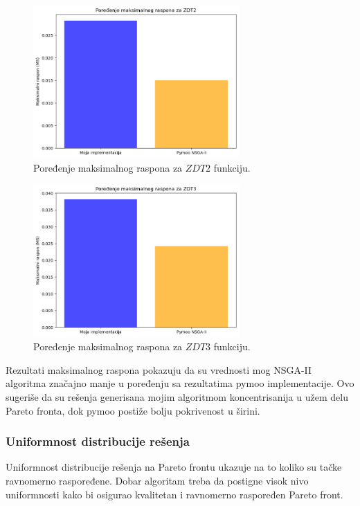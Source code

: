\documentclass[12pt]{article}
\begin{document}
\begin{figure}[H]
    \centering
    \includegraphics[width=0.7\textwidth]{images/ms_zdt2.png}
    \caption{Poređenje maksimalnog raspona za \( ZDT2 \) funkciju.}
    \label{fig:ms_zdt2}
\end{figure}

\begin{figure}[H]
    \centering
    \includegraphics[width=0.7\textwidth]{images/ms_zdt3.png}
    \caption{Poređenje maksimalnog raspona za \( ZDT3 \) funkciju.}
    \label{fig:ms_zdt3}
\end{figure}

Rezultati maksimalnog raspona pokazuju da su vrednosti mog NSGA-II algoritma značajno manje u poređenju sa rezultatima pymoo implementacije.
Ovo sugeriše da su rešenja generisana mojim algoritmom koncentrisanija u užem delu Pareto fronta, dok pymoo postiže bolju pokrivenost u širini.
 	

\subsubsection{Uniformnost distribucije rešenja}
Uniformnost distribucije rešenja na Pareto frontu ukazuje na to koliko su tačke ravnomerno raspoređene. Dobar algoritam treba da postigne visok nivo uniformnosti kako bi osigurao kvalitetan i ravnomerno raspoređen Pareto front.
\end{document}
